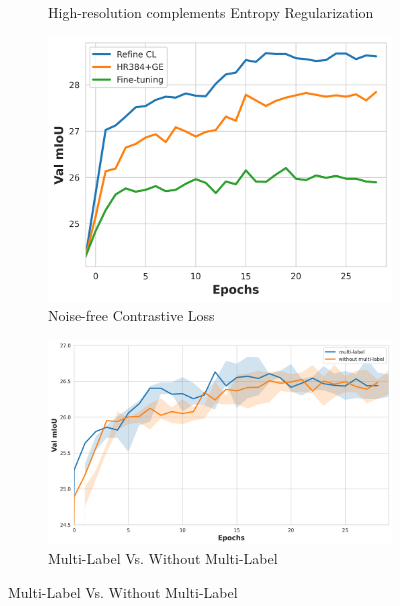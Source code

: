 \begin{figure}[t]
\begin{subfigure}{0.48\textwidth}
    \caption{High-resolution complements Entropy Regularization}
\label{fig:plot_hr_ger}
\end{subfigure}
\hfill
\begin{subfigure}{0.48\textwidth}
    \centering
    \includegraphics[width=\linewidth]{figures/experiments/baselineplots/baseline.png}
    \caption{Noise-free Contrastive Loss}
\label{fig:plot_nonoisycl}
\end{subfigure}
\hfill
\begin{subfigure}{0.5\textwidth}
    \centering
    \includegraphics[width=\linewidth]{figures/experiments/baselineplots/texthierarchy (4).png}
    \caption{Multi-Label Vs. Without Multi-Label}
\label{fig:plot_text}
\end{subfigure}

\end{figure}

